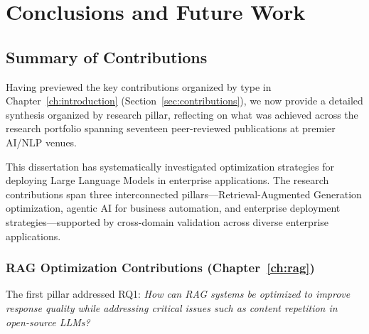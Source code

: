 \chapter{Conclusions and Future Work}
\label{ch:conclusions}

\section{Summary of Contributions}
\label{sec:contributions_summary}

Having previewed the key contributions organized by type in Chapter~\ref{ch:introduction} (Section~\ref{sec:contributions}), we now provide a detailed synthesis organized by research pillar, reflecting on what was achieved across the research portfolio spanning seventeen peer-reviewed publications at premier AI/NLP venues.

This dissertation has systematically investigated optimization strategies for deploying Large Language Models in enterprise applications. The research contributions span three interconnected pillars---Retrieval-Augmented Generation optimization, agentic AI for business automation, and enterprise deployment strategies---supported by cross-domain validation across diverse enterprise applications.

\subsection{RAG Optimization Contributions (Chapter~\ref{ch:rag})}

The first pillar addressed RQ1: \textit{How can RAG systems be optimized to improve response quality while addressing critical issues such as content repetition in open-source LLMs?}

